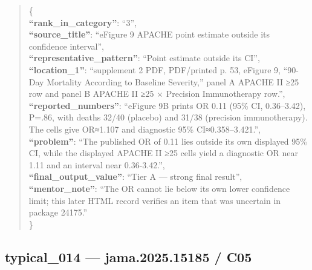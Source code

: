 \documentclass[
  letterpaper,
  9pt]{extreport}
\begin{document}
\begin{quote}
\{\\
\textbf{``rank\_in\_category''}: ``3'',\\
\textbf{``source\_title''}: ``eFigure 9 APACHE point estimate outside
its confidence interval'',\\
\textbf{``representative\_pattern''}: ``Point estimate outside its
CI'',\\
\textbf{``location\_1''}: ``supplement 2 PDF, PDF/printed p. 53, eFigure
9, ``90-Day Mortality According to Baseline Severity,'' panel A APACHE
II ≥25 row and panel B APACHE II ≥25 × Precision Immunotherapy row.'',\\
\textbf{``reported\_numbers''}: ``eFigure 9B prints OR 0.11 (95\% CI,
0.36--3.42), P=.86, with deaths 32/40 (placebo) and 31/38 (precision
immunotherapy). The cells give OR≈1.107 and diagnostic 95\%
CI≈0.358--3.421.'',\\
\textbf{``problem''}: ``The published OR of 0.11 lies outside its own
displayed 95\% CI, while the displayed APACHE II ≥25 cells yield a
diagnostic OR near 1.11 and an interval near 0.36-3.42.'',\\
\textbf{``final\_output\_value''}: ``Tier A --- strong final result'',\\
\textbf{``mentor\_note''}: ``The OR cannot lie below its own lower
confidence limit; this later HTML record verifies an item that was
uncertain in package 24175.''\\
\}
\end{quote}

\hypertarget{typical_014--jama202515185--c05}{%
\subsection{typical\_014 --- jama.2025.15185 /
C05}\label{typical_014--jama202515185--c05}}
\end{document}
